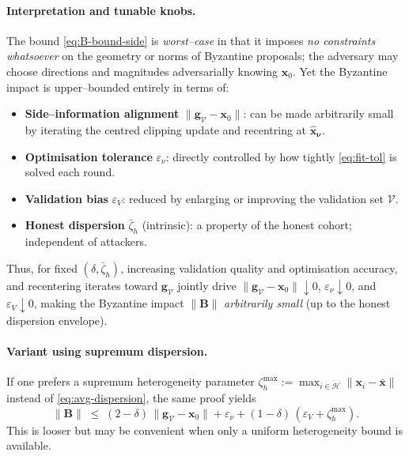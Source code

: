 \documentclass{article}
\theoremstyle{plain}
\theoremstyle{definition}
\theoremstyle{remark}
\begin{document}
\paragraph{Interpretation and tunable knobs.}
The bound \eqref{eq:B-bound-side} is \emph{worst–case} in that it imposes
\emph{no constraints whatsoever} on the geometry or norms of Byzantine proposals;
the adversary may choose directions and magnitudes adversarially knowing $\bm{x}_0$.
Yet the Byzantine impact is upper–bounded entirely in terms of:
\begin{itemize}
\item \textbf{Side–information alignment} $\|\bm{g}_{\mathcal{V}}-\bm{x}_0\|$:
can be made arbitrarily small by iterating the centred clipping update and recentring at
$\hat{\bm{x}}_{\bm{\nu}}$.
\item \textbf{Optimisation tolerance} $\varepsilon_\nu$:
directly controlled by how tightly \eqref{eq:fit-tol} is solved each round.
\item \textbf{Validation bias} $\varepsilon_V$:
reduced by enlarging or improving the validation set $\mathcal{V}$.
\item \textbf{Honest dispersion} $\bar{\zeta}_h$ (intrinsic):
a property of the honest cohort; independent of attackers.
\end{itemize}
Thus, for fixed $(\delta,\bar{\zeta}_h)$, increasing validation quality and optimisation accuracy,
and recentering iterates toward $\bm{g}_{\mathcal{V}}$ jointly drive
$\|\bm{g}_{\mathcal{V}}-\bm{x}_0\|\!\downarrow 0$, $\varepsilon_\nu\!\downarrow 0$, and
$\varepsilon_V\!\downarrow 0$, making the Byzantine impact \(\|\bm{B}\|\) \emph{arbitrarily small}
(up to the honest dispersion envelope).

\paragraph{Variant using supremum dispersion.}
If one prefers a supremum heterogeneity parameter $\zeta_h^{\max}:=\max_{i\in\mathcal{H}}\|\bm{x}_i-\bar{\bm{x}}\|$
instead of \eqref{eq:avg-dispersion}, the same proof yields
\[
\|\bm{B}\|
\;\le\;
(2-\delta)\,\|\bm{g}_{\mathcal{V}}-\bm{x}_0\|
+ \varepsilon_\nu
+ (1-\delta)\,(\varepsilon_V+\zeta_h^{\max}).
\]
This is looser but may be convenient when only a uniform heterogeneity bound is available.
\end{document}
